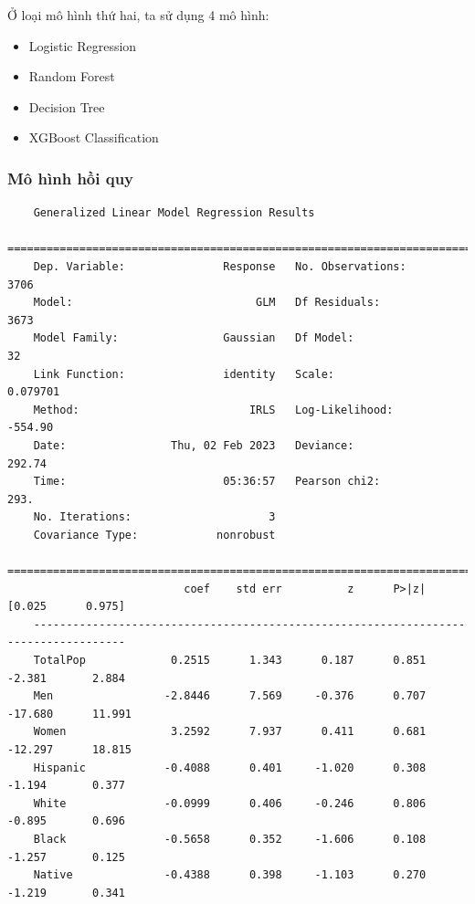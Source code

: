 \documentclass[14pt, a4paper]{article}
\numberwithin{equation}{section}
\numberwithin{figure}{section}
\numberwithin{dl}{section}
\numberwithin{md}{section}
\numberwithin{bd}{section}
\numberwithin{dn}{section}
\numberwithin{hq}{section}
\begin{document}
    Ở loại mô hình thứ hai, ta sử dụng 4 mô hình:

    \begin{itemize}
        \item Logistic Regression
        \item Random Forest
        \item Decision Tree
        \item XGBoost Classification
    \end{itemize}

    \subsubsection{Mô hình hồi quy}

    \begin{verbatim}
    Generalized Linear Model Regression Results                  
    ==============================================================================
    Dep. Variable:               Response   No. Observations:                 3706
    Model:                            GLM   Df Residuals:                     3673
    Model Family:                Gaussian   Df Model:                           32
    Link Function:               identity   Scale:                        0.079701
    Method:                          IRLS   Log-Likelihood:                -554.90
    Date:                Thu, 02 Feb 2023   Deviance:                       292.74
    Time:                        05:36:57   Pearson chi2:                     293.
    No. Iterations:                     3                                         
    Covariance Type:            nonrobust                                         
    ====================================================================================
                           coef    std err          z      P>|z|      [0.025      0.975]
    ------------------------------------------------------------------------------------
    TotalPop             0.2515      1.343      0.187      0.851      -2.381       2.884
    Men                 -2.8446      7.569     -0.376      0.707     -17.680      11.991
    Women                3.2592      7.937      0.411      0.681     -12.297      18.815
    Hispanic            -0.4088      0.401     -1.020      0.308      -1.194       0.377
    White               -0.0999      0.406     -0.246      0.806      -0.895       0.696
    Black               -0.5658      0.352     -1.606      0.108      -1.257       0.125
    Native              -0.4388      0.398     -1.103      0.270      -1.219       0.341

\end{verbatim}
\end{document}
